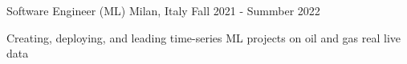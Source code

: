 

\begin{cventries}


 \cventry
    {} %
    {Software Engineer (ML)} %
    {Milan, Italy} %
    {Fall 2021 - Summber 2022} %
    {
      \begin{cvitems} %
        \item {Creating, deploying, and leading time-series ML projects on oil and gas real live data}
      \end{cvitems}
    }


\end{cventries}
